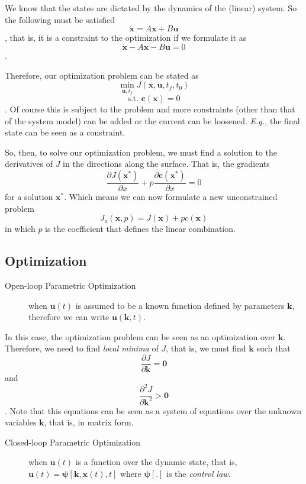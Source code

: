 We know that the states are dictated by the dynamics of the (linear) system. So the following must be satisfied \[
    \dot{\bm{x}} = A\bm{x} + B\bm{u}
\], that is, it is a constraint to the optimization if we formulate it as \[
    \dot{\bm{x}} - A\bm{x} - B\bm{u} = 0
\].

Therefore, our optimization problem can be stated as \[
    \min_{\bm{u}, t_f} J(\bm{x},\bm{u},t_f,t_0)
\] \[
\textrm{s.t. } \bm{c}(\bm{x}) = 0
\]. Of course this is subject to the problem and more constraints (other than that of the system model) can be added or the current can be loosened. \emph{E.g.,} the final state can be seen as a constraint.

So, then, to solve our optimization problem, we must find a solution to the derivatives of $J$ in the directions along the surface. That is, the gradients \[
    \frac{\partial J(\bm{x}^*)}{\partial x} + p \frac{\partial \bm{c}(\bm{x}^*)}{\partial x} = 0
\] for a solution $\bm{x}^*$. Which means we can now formulate a new unconstrained problem \[
    J_a(\bm{x}, p) = J(\bm{x}) + pc(\bm{x})
\] in which $p$ is the coefficient that defines the linear combination.

\subsection*{Optimization}

\begin{description}
    \item[Open-loop Parametric Optimization] when $\bm{u}(t)$ is assumed to be a known function defined by parameters $\bm{k}$, therefore we can write $\bm{u}(\bm{k},t)$.
\end{description}

In this case, the optimization problem can be seen as an optimization over $\bm{k}$. Therefore, we need to find \emph{local minima} of $J$, that is, we must find $\bm{k}$ such that \[
    \frac{\partial J}{\partial \bm{k}}=\bm{0}
\] and \[
\frac{\partial^{2}J}{\partial \bm{k}^{2}}>\bm{0}
\]. Note that this equations can be seen as a system of equations over the unknown variables $\bm{k}$, that is, in matrix form.

\begin{description}
    \item[Closed-loop Parametric Optimization] when  $\bm{u}(t)$ is a function over the dynamic state, that is, $\bm{u}(t) = \bm{\psi}[\bm{k},\bm{x}(t),t]$ where $\bm{\psi}[.]$ is the \emph{control law}.
\end{description}
